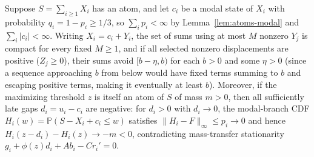 \documentclass[11pt]{article}
\numberwithin{equation}{section}
\theoremstyle{definition}
\newcommand{\Pp}{\mathbb P}
\begin{document}
Suppose $S=\sum_{i\ge1}X_i$ has an atom, and let $c_i$ be a modal state of
$X_i$ with probability $q_i=1-p_i\ge1/3$, so $\sum_i p_i<\infty$ by
Lemma~\ref{lem:atoms-modal} and $\sum_i|c_i|<\infty$. Writing $X_i=c_i+Y_i$,
the set of sums using at most $M$ nonzero $Y_j$ is compact for every fixed
$M\ge1$, and if all selected nonzero displacements are positive ($Z_j\ge0$),
their sums avoid $[b-\eta,b)$ for each $b>0$ and some $\eta>0$ (since a
sequence approaching $b$ from below would have fixed terms summing to $b$ and
escaping positive terms, making it eventually at least $b$). Moreover, if the
maximizing threshold $z$ is itself an atom of $S$ of mass $m>0$, then all
sufficiently late gaps $d_i=u_i-c_i$ are negative: for $d_i>0$ with
$d_i\to0$, the modal-branch CDF $H_i(w)=\Pp(S-X_i+c_i\le w)$ satisfies
$\|H_i-F\|_\infty\le p_i\to0$ and hence $H_i(z-d_i)-H_i(z)\to-m<0$,
contradicting mass-transfer stationarity $g_i+\phi(z)d_i+Ab_i-Cr_i'=0$.
\end{document}
